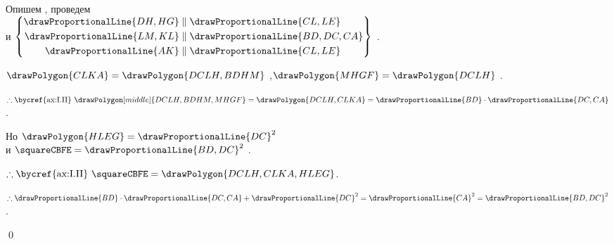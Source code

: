 \documentclass[letters]{byrne-book}
\begin{document}
\begin{center}
Опишем  , проведем \\
и $\left\{
\begin{aligned}
	\drawProportionalLine{DH,HG} & \parallel \drawProportionalLine{CL,LE} \\
	\drawProportionalLine{LM,KL} & \parallel \drawProportionalLine{BD,DC,CA} \\
	\drawProportionalLine{AK} & \parallel \drawProportionalLine{CL,LE} \\
\end{aligned}
\right\}$ .

$\drawPolygon{CLKA} = \drawPolygon{DCLH,BDHM}$ ,$\drawPolygon{MHGF} = \drawPolygon{DCLH}$ .

$\therefore \mbox{\bycref{ax:I.II} } \drawPolygon[middle]{DCLH,BDHM,MHGF} = \drawPolygon{DCLH,CLKA} = \drawProportionalLine{BD} \cdot \drawProportionalLine{DC,CA}$.

Но $\drawPolygon{HLEG} = \drawProportionalLine{DC}^2$ \\
и $\squareCBFE = \drawProportionalLine{BD,DC}^2$ \bycref{\constref}.

$\therefore \mbox{\bycref{ax:I.II} } \squareCBFE = \drawPolygon{DCLH,CLKA,HLEG}$.

$\therefore \drawProportionalLine{BD} \cdot \drawProportionalLine{DC,CA} + \drawProportionalLine{DC}^2 = \drawProportionalLine{CA}^2 = \drawProportionalLine{BD,DC}^2$.
\end{center}

\qed
\end{document}
